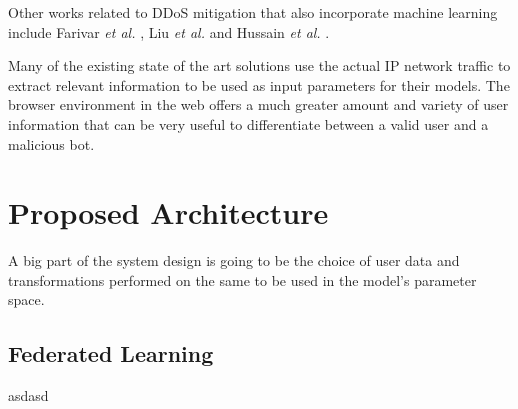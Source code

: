 \documentclass[
    fontsize=12pt,
    headings=small,
    parskip=half,           %
    bibliography=totoc,
    numbers=noenddot,       %
    open=any,               %
    ]{scrreprt}
\begin{document}
Other works related to DDoS mitigation that also incorporate machine learning include Farivar \emph{et al.} \cite{FaFa2020}, Liu \emph{et al.} \cite{8594641} and Hussain \emph{et al.} \cite{9000893}.

Many of the existing state of the art solutions use the actual IP network traffic to extract relevant information to be used as input parameters for their models. The browser environment in the web offers a much greater amount and variety of user information that can be very useful to differentiate between a valid user and a malicious bot.


\chapter{Proposed Architecture}

A big part of the system design is going to be the choice of user data and transformations performed on the same to be used in the model's parameter space.

\section{Federated Learning}

asdasd


\begin{raggedright}
  \printbibliography
\end{raggedright}
\end{document}
